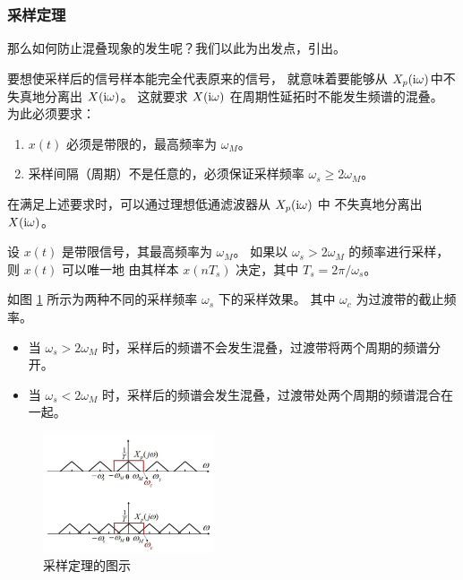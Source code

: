 \subsubsection{采样定理}

那么如何防止混叠现象的发生呢？我们以此为出发点，引出。

要想使采样后的信号样本能完全代表原来的信号，
就意味着要能够从 $X_p(\mathrm{i} \omega)$中不失真地分离出 $X(\mathrm{i} \omega)$。
这就要求 $X(\mathrm{i} \omega)$ 在周期性延拓时不能发生频谱的混叠。
为此必须要求：
\begin{enumerate}
    \item $x(t)$ 必须是带限的，最高频率为 $\omega_M$。
    \item 采样间隔（周期）不是任意的，必须保证采样频率 $\omega_s \ge 2\omega_M$。
\end{enumerate}
在满足上述要求时，可以通过理想低通滤波器从 $X_p(\mathrm{i} \omega)$ 中
不失真地分离出 $X(\mathrm{i} \omega)$。

\begin{theorem}
    设 $x(t)$ 是带限信号，其最高频率为 $\omega_M$。
    如果以 $\omega_s > 2\omega_M$ 的频率进行采样，则 $x(t)$ 可以唯一地
    由其样本 $x(nT_s)$ 决定，其中 $T_s = 2\pi/\omega_s$。
\end{theorem}

\begin{example}[采样定理的图示]
    如图 \ref{fig:sampling-theorem} 所示为两种不同的采样频率 $\omega_s$ 下的采样效果。
    其中 $\omega_c$ 为过渡带的截止频率。
    \begin{itemize}
        \item 当 $\omega_s > 2\omega_M$ 时，采样后的频谱不会发生混叠，过渡带将两个周期的频谱分开。
        \item 当 $\omega_s < 2\omega_M$ 时，采样后的频谱会发生混叠，过渡带处两个周期的频谱混合在一起。
    \end{itemize}
    \begin{figure}[H]
        \centering
        \includegraphics[width=0.45\textwidth]{chap2/img/sampling-theorem.png}
        \caption{采样定理的图示}
        \label{fig:sampling-theorem}
    \end{figure}
\end{example}

